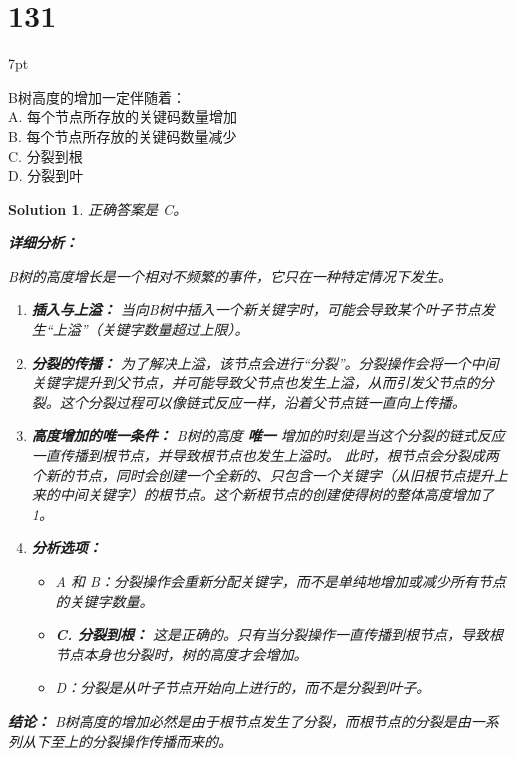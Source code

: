 \documentclass[UTF8]{report}
\newtheorem{solution}{Solution}
\theoremstyle{MyLineTheoremStyle} %
\theoremstyle{MyBlockTheoremStyle} %
\theoremstyle{MySubsubsectionStyle} %
\newenvironment{graybox}{%
        \def\FrameCommand{%
        \hspace{1pt}%
        {\color{gray}\small \vrule width 2pt}%
        {\color{graybox_color}\vrule width 4pt}%
        \colorbox{graybox_color}%
        }%
        \MakeFramed{\advance\hsize-\width\FrameRestore}%
        \noindent\hspace{-4.55pt}%
        \begin{adjustwidth}{}{7pt}%
        \vspace{2pt}\vspace{2pt}%
        }
        {%
        \vspace{2pt}\end{adjustwidth}\endMakeFramed%
        }
\begin{document}
\section*{131}
\begin{graybox}
B树高度的增加一定伴随着：\\
A. 每个节点所存放的关键码数量增加\\
B. 每个节点所存放的关键码数量减少\\
C. 分裂到根\\
D. 分裂到叶
\end{graybox}

\begin{solution}
正确答案是 C。

\textbf{详细分析：}

B树的高度增长是一个相对不频繁的事件，它只在一种特定情况下发生。

\begin{enumerate}
    \item \textbf{插入与上溢：} 当向B树中插入一个新关键字时，可能会导致某个叶子节点发生“上溢”（关键字数量超过上限）。

    \item \textbf{分裂的传播：} 为了解决上溢，该节点会进行“分裂”。分裂操作会将一个中间关键字提升到父节点，并可能导致父节点也发生上溢，从而引发父节点的分裂。这个分裂过程可以像链式反应一样，沿着父节点链一直向上传播。

    \item \textbf{高度增加的唯一条件：} B树的高度 \textbf{唯一} 增加的时刻是当这个分裂的链式反应一直传播到根节点，并导致根节点也发生上溢时。
    此时，根节点会分裂成两个新的节点，同时会创建一个全新的、只包含一个关键字（从旧根节点提升上来的中间关键字）的根节点。这个新根节点的创建使得树的整体高度增加了1。

    \item \textbf{分析选项：}
    \begin{itemize}
        \item A 和 B：分裂操作会重新分配关键字，而不是单纯地增加或减少所有节点的关键字数量。
        \item \textbf{C. 分裂到根：} 这是正确的。只有当分裂操作一直传播到根节点，导致根节点本身也分裂时，树的高度才会增加。
        \item D：分裂是从叶子节点开始向上进行的，而不是分裂到叶子。
    \end{itemize}
\end{enumerate}

\textbf{结论：}
B树高度的增加必然是由于根节点发生了分裂，而根节点的分裂是由一系列从下至上的分裂操作传播而来的。
\end{solution}
\end{document}
